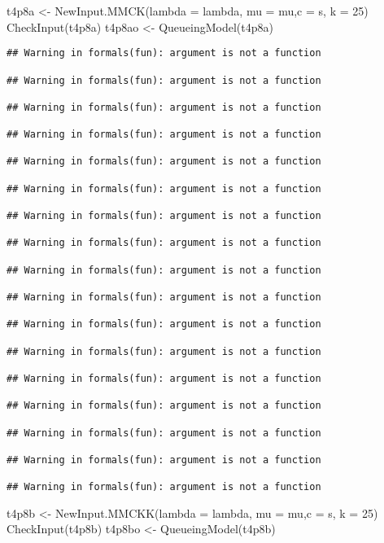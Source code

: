 \documentclass[
]{article}
\newenvironment{Shaded}{\begin{snugshade}}{\end{snugshade}}
\newcommand{\AttributeTok}[1]{\textcolor[rgb]{0.77,0.63,0.00}{#1}}
\newcommand{\DecValTok}[1]{\textcolor[rgb]{0.00,0.00,0.81}{#1}}
\newcommand{\FunctionTok}[1]{\textcolor[rgb]{0.00,0.00,0.00}{#1}}
\newcommand{\NormalTok}[1]{#1}
\newcommand{\OtherTok}[1]{\textcolor[rgb]{0.56,0.35,0.01}{#1}}
\begin{document}
\begin{Shaded}
\begin{Highlighting}[]
\NormalTok{t4p8a }\OtherTok{\textless{}{-}} \FunctionTok{NewInput.MMCK}\NormalTok{(}\AttributeTok{lambda =}\NormalTok{ lambda, }\AttributeTok{mu =}\NormalTok{ mu,}\AttributeTok{c =}\NormalTok{ s, }\AttributeTok{k =} \DecValTok{25}\NormalTok{)}
\FunctionTok{CheckInput}\NormalTok{(t4p8a)}
\NormalTok{t4p8ao }\OtherTok{\textless{}{-}} \FunctionTok{QueueingModel}\NormalTok{(t4p8a)}
\end{Highlighting}
\end{Shaded}

\begin{verbatim}
## Warning in formals(fun): argument is not a function

## Warning in formals(fun): argument is not a function

## Warning in formals(fun): argument is not a function

## Warning in formals(fun): argument is not a function

## Warning in formals(fun): argument is not a function

## Warning in formals(fun): argument is not a function

## Warning in formals(fun): argument is not a function

## Warning in formals(fun): argument is not a function

## Warning in formals(fun): argument is not a function

## Warning in formals(fun): argument is not a function

## Warning in formals(fun): argument is not a function

## Warning in formals(fun): argument is not a function

## Warning in formals(fun): argument is not a function

## Warning in formals(fun): argument is not a function

## Warning in formals(fun): argument is not a function

## Warning in formals(fun): argument is not a function

## Warning in formals(fun): argument is not a function
\end{verbatim}

\begin{Shaded}
\begin{Highlighting}[]
\NormalTok{t4p8b }\OtherTok{\textless{}{-}} \FunctionTok{NewInput.MMCKK}\NormalTok{(}\AttributeTok{lambda =}\NormalTok{ lambda, }\AttributeTok{mu =}\NormalTok{ mu,}\AttributeTok{c =}\NormalTok{ s, }\AttributeTok{k =} \DecValTok{25}\NormalTok{)}
\FunctionTok{CheckInput}\NormalTok{(t4p8b)}
\NormalTok{t4p8bo }\OtherTok{\textless{}{-}} \FunctionTok{QueueingModel}\NormalTok{(t4p8b)}
\end{Highlighting}
\end{Shaded}
\end{document}

